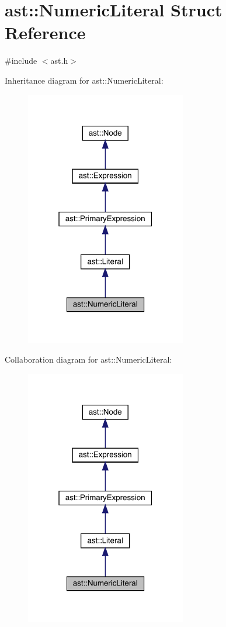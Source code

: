 \hypertarget{structast_1_1_numeric_literal}{}\section{ast\+:\+:Numeric\+Literal Struct Reference}
\label{structast_1_1_numeric_literal}


{\ttfamily \#include $<$ast.\+h$>$}



Inheritance diagram for ast\+:\+:Numeric\+Literal\+:
\nopagebreak
\begin{figure}[H]
\begin{center}
\leavevmode
\includegraphics[width=199pt]{structast_1_1_numeric_literal__inherit__graph}
\end{center}
\end{figure}


Collaboration diagram for ast\+:\+:Numeric\+Literal\+:
\nopagebreak
\begin{figure}[H]
\begin{center}
\leavevmode
\includegraphics[width=199pt]{structast_1_1_numeric_literal__coll__graph}
\end{center}
\end{figure}
